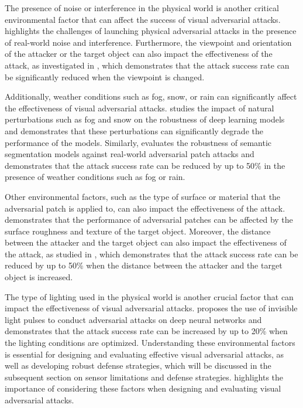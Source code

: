 \documentclass[11pt]{article}
\begin{document}
The presence of noise or interference in the physical world is another critical environmental factor that can affect the success of visual adversarial attacks. \cite{ref142} highlights the challenges of launching physical adversarial attacks in the presence of real-world noise and interference. Furthermore, the viewpoint and orientation of the attacker or the target object can also impact the effectiveness of the attack, as investigated in \cite{ref143}, which demonstrates that the attack success rate can be significantly reduced when the viewpoint is changed.

Additionally, weather conditions such as fog, snow, or rain can significantly affect the effectiveness of visual adversarial attacks. \cite{ref144} studies the impact of natural perturbations such as fog and snow on the robustness of deep learning models and demonstrates that these perturbations can significantly degrade the performance of the models. Similarly, \cite{ref145} evaluates the robustness of semantic segmentation models against real-world adversarial patch attacks and demonstrates that the attack success rate can be reduced by up to 50\% in the presence of weather conditions such as fog or rain.

Other environmental factors, such as the type of surface or material that the adversarial patch is applied to, can also impact the effectiveness of the attack. \cite{ref146} demonstrates that the performance of adversarial patches can be affected by the surface roughness and texture of the target object. Moreover, the distance between the attacker and the target object can also impact the effectiveness of the attack, as studied in \cite{ref147}, which demonstrates that the attack success rate can be reduced by up to 50\% when the distance between the attacker and the target object is increased.

The type of lighting used in the physical world is another crucial factor that can impact the effectiveness of visual adversarial attacks. \cite{ref2} proposes the use of invisible light pulses to conduct adversarial attacks on deep neural networks and demonstrates that the attack success rate can be increased by up to 20\% when the lighting conditions are optimized. Understanding these environmental factors is essential for designing and evaluating effective visual adversarial attacks, as well as developing robust defense strategies, which will be discussed in the subsequent section on sensor limitations and defense strategies. \cite{ref18} highlights the importance of considering these factors when designing and evaluating visual adversarial attacks.
\end{document}
